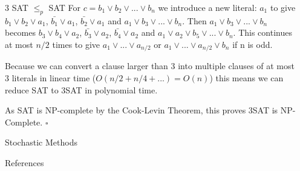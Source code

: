 \documentclass[final]{beamer}
\newlength{\sepwidth}
\newlength{\colwidth}
\newcounter{col}
\newcommand{\separatorcolumn}{\begin{column}{\sepwidth}\end{column}}
\begin{document}
\begin{frame}[t]
\begin{columns}[t]
\begin{column}{\colwidth}
\begin{block}{3 SAT $\leq_p$  SAT}
For $c = b_1 \lor b_2 \lor ... \lor b_n$ we introduce a new literal: $a_1$ to give $b_1 \lor b_2 \lor a_1$, $\bar{b_1} \lor a_1$, $\bar{b_2} \lor a_1$ and $a_1 \lor b_3 \lor ... \lor b_n$. Then $a_1 \lor b_3 \lor ... \lor b_n$ becomes $b_3 \lor b_4 \lor a_2$, $\bar{b_3} \lor a_2$, $\bar{b_4} \lor a_2$ and $a_1 \lor a_2 \lor b_5 \lor ... \lor b_n$. This continues at most $n/2$ times to give $a_1 \lor ... \lor a_{n/2}$ or $a_1 \lor ... \lor a_{n/2} \lor b_n$ if n is odd. 

Because we can convert a clause larger than 3 into multiple clauses of at most 3 literals in linear time ($O(n/2 + n/4 + ...) = O(n)$) this means we can reduce SAT to 3SAT in polynomial time. 

As SAT is NP-complete by the Cook-Levin Theorem, this proves 3SAT is NP-Complete. $\square$

  \end{block}
  \begin{exampleblock}{Stochastic Methods}













  \end{exampleblock}
  \begin{block}{References}
    \nocite{*}
    \footnotesize{}
  \end{block}
\end{column}

\separatorcolumn
\end{columns}
\end{frame}
\end{document}
